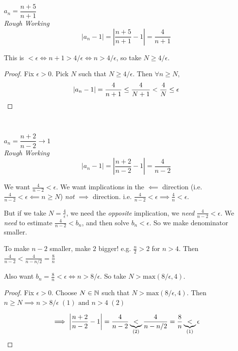 \documentclass[10pt,twoside]{scrartcl}
\begin{document}
\begin{example}
$a_n = \dfrac{n+5}{n+1}$\\

\emph{Rough Working}
\[ |a_n - 1| = \left| \dfrac{n+5}{n+1} -1 \right| = \dfrac{4}{n+1}\]

This is $< \epsilon \iff n+1 > 4/\epsilon \iff n > 4/\epsilon$, so take $N \geq 4/\epsilon$.\\

\begin{proof}
Fix $\epsilon > 0$. Pick $N$ such that $N \geq 4/\epsilon$. Then $\forall n \geq N$, \[|a_n - 1| = \frac{4}{n+1} \leq \frac{4}{N+1} < \frac{4}{N} \leq \epsilon\qedhere\]
\end{proof}
\end{example}~

\begin{example}$a_n = \dfrac{n+2}{n-2} \to 1$\\

\emph{Rough Working} 
\[|a_n -1| = \left|\frac{n+2}{n-2} - 1\right| = \frac{4}{n-2}\]

We want $\frac{4}{n-2} < \epsilon$. We want implications in the $\impliedby$ direction (i.e. $\frac{4}{n-2} < \epsilon \impliedby n \geq N$) \emph{not} $\implies$ direction. i.e. $\frac{4}{n-2} < \epsilon \implies \frac{4}{n} < \epsilon$.

But if we take $N = \frac{4}{\epsilon}$, we need the \emph{opposite} implication, we \emph{need} $\frac{4}{n-2} < \epsilon$. We \emph{need} to estimate $\frac{4}{n-2} < b_n$, and then solve $b_n < \epsilon$. So we make denominator smaller. 

To make $n-2$ smaller, make $2$ bigger! e.g. $\frac{n}{2}>2$ for $n>4$. Then $\frac{4}{n-2} < \frac{4}{n-n/2} = \frac{8}{n}$

Also want $b_n = \frac{8}{n} < \epsilon \iff n > 8/\epsilon$. So take $N > \mathrm{max}(8/\epsilon, 4)$.\\

\begin{proof}
Fix $\epsilon > 0.$	Choose $N \in\mathbb{N}$ such that $N > \mathrm{max}(8/\epsilon, 4)$. Then $n \geq N \implies n > 8/\epsilon\; (1)\text{ and }n > 4 \; (2) $

\[\implies\left|\frac{n+2}{n-2} - 1\right| = \frac{4}{n-2} \underbrace{<}_{(2)} \frac{4}{n-n/2} = \frac{8}{n} \underbrace{<}_{(1)} \epsilon\qedhere\]

\end{proof}

	
\end{example}\vspace*{5pt}
\end{document}
